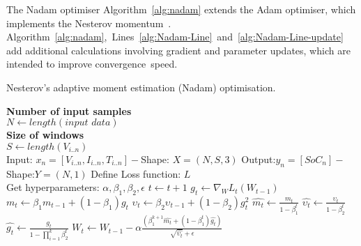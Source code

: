 %
The Nadam optimiser \mbox{Algorithm~\ref{alg:nadam}} extends the Adam optimiser, which implements the Nesterov momentum~\cite{dozat_nadam_2016}.
\mbox{Algorithm~\ref{alg:nadam}, Lines~\ref{alg:Nadam-Line} and~\ref{alg:Nadam-Line-update}} add additional calculations involving gradient and parameter updates, which are intended to improve convergence~speed.
\begin{algorithm}[H]%
\caption{Nesterov's adaptive moment estimation (Nadam) optimisation.}
\begin{algorithmic}[1]
  \STATE \textbf{Number of input samples} \\ $N\gets length(\textit{input data})$\\
  \STATE \textbf{Size of windows} \\ $S\gets length(V_{i..n})$\\
  \STATE Input: $x_n = [V_{i..n}, I_{i..n}, T_{i..n}] - $Shape: $X = (N, S, 3)$
  \STATE Output:$y_n = [SoC_{n}] - $Shape:$Y = (N, 1)$
  \STATE Define Loss function: $L$ \\
  Get hyperparameters: $\alpha, \beta_1, \beta_2, \epsilon$
    \STATE $t \gets t+1$
    \STATE $g_t \gets \nabla_W L_t (W_{t-1})$ 
    \STATE $m_t \gets \beta_1 m_{t-1}+(1-\beta_1) g_t $ 
    \STATE $\upsilon_t \gets \beta_2 \upsilon_{t-1}+ \left(1-\beta_2 \right)g^2_t $ 
    \STATE $\hat{m_t} \gets \frac{m_t}{1-\beta^t_1}$ 
    \STATE $\hat{\upsilon_t} \gets \frac{\upsilon_t}{1-\beta^t_2} $ 
    \STATE $\hat{g_t} \gets \frac{g_t}{1-\prod\nolimits_{i = 1}^{k}\beta^t_2} $ 
    \STATE $W_t \gets W_{t-1}-\alpha
    \frac{\left(\beta^{k+1}_1\hat{m_t}+\left(1-\beta^t_1\right)\hat{g_t}\right)}
    {\sqrt{\hat{\upsilon_t}}+\epsilon}$
  \ENDWHILE
  \end{algorithmic}
  \label{alg:nadam}
\end{algorithm}

